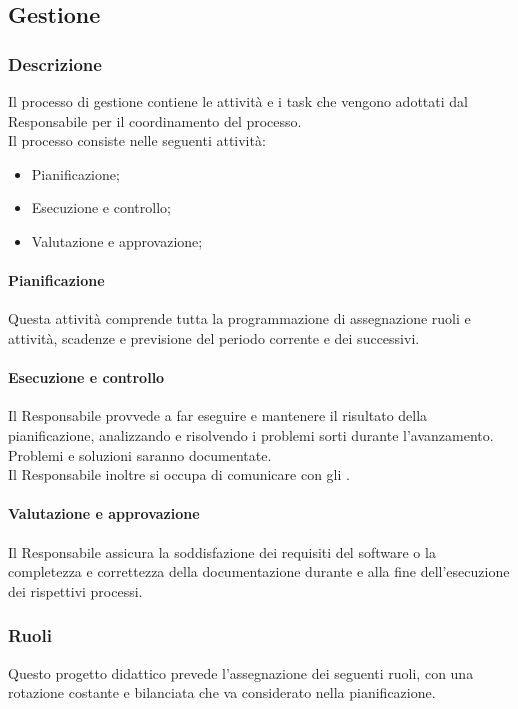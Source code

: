 \subsection{Gestione}

\subsubsection{Descrizione}
Il processo di gestione contiene le attività e i task che vengono adottati dal Responsabile per il coordinamento del processo.\\
Il processo consiste nelle seguenti attività:
\begin{itemize}
  \item Pianificazione;
  \item Esecuzione e controllo;
  \item Valutazione e approvazione;
\end{itemize}

\paragraph{Pianificazione}
Questa attività comprende tutta la programmazione di assegnazione ruoli e attività, scadenze e previsione del periodo corrente e dei successivi.

\paragraph{Esecuzione e controllo}
Il Responsabile provvede a far eseguire e mantenere il risultato della pianificazione, analizzando e risolvendo i problemi sorti durante l'avanzamento. Problemi e soluzioni saranno documentate.\\
Il Responsabile inoltre si occupa di comunicare con gli .

\paragraph{Valutazione e approvazione}
Il Responsabile assicura la soddisfazione dei requisiti del software o la completezza e correttezza della documentazione durante e alla fine dell'esecuzione dei rispettivi processi.

\subsubsection{Ruoli}
Questo progetto didattico prevede l'assegnazione dei seguenti ruoli, con una rotazione costante e bilanciata che va considerato nella pianificazione.


